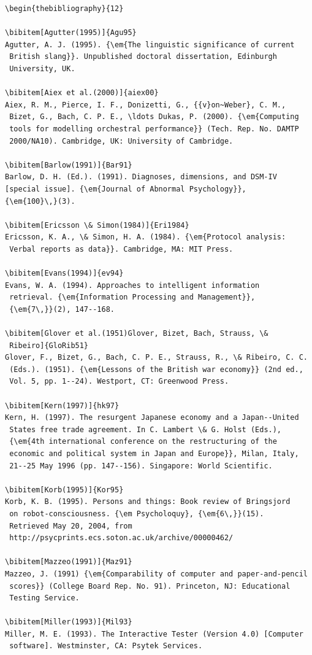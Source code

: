 \documentclass{nCSE2e}
\begin{document}
\begin{verbatim}
\begin{thebibliography}{12}

\bibitem[Agutter(1995)]{Agu95}
Agutter, A. J. (1995). {\em{The linguistic significance of current
 British slang}}. Unpublished doctoral dissertation, Edinburgh
 University, UK.

\bibitem[Aiex et al.(2000)]{aiex00}
Aiex, R. M., Pierce, I. F., Donizetti, G., {{v}on~Weber}, C. M.,
 Bizet, G., Bach, C. P. E., \ldots Dukas, P. (2000). {\em{Computing
 tools for modelling orchestral performance}} (Tech. Rep. No. DAMTP
 2000/NA10). Cambridge, UK: University of Cambridge.

\bibitem[Barlow(1991)]{Bar91}
Barlow, D. H. (Ed.). (1991). Diagnoses, dimensions, and DSM-IV
[special issue]. {\em{Journal of Abnormal Psychology}},
{\em{100}\,}(3).

\bibitem[Ericsson \& Simon(1984)]{Eri1984}
Ericsson, K. A., \& Simon, H. A. (1984). {\em{Protocol analysis:
 Verbal reports as data}}. Cambridge, MA: MIT Press.

\bibitem[Evans(1994)]{ev94}
Evans, W. A. (1994). Approaches to intelligent information
 retrieval. {\em{Information Processing and Management}},
 {\em{7\,}}(2), 147--168.

\bibitem[Glover et al.(1951)Glover, Bizet, Bach, Strauss, \&
 Ribeiro]{GloRib51}
Glover, F., Bizet, G., Bach, C. P. E., Strauss, R., \& Ribeiro, C. C.
 (Eds.). (1951). {\em{Lessons of the British war economy}} (2nd ed.,
 Vol. 5, pp. 1--24). Westport, CT: Greenwood Press.

\bibitem[Kern(1997)]{hk97}
Kern, H. (1997). The resurgent Japanese economy and a Japan--United
 States free trade agreement. In C. Lambert \& G. Holst (Eds.),
 {\em{4th international conference on the restructuring of the
 economic and political system in Japan and Europe}}, Milan, Italy,
 21--25 May 1996 (pp. 147--156). Singapore: World Scientific.

\bibitem[Korb(1995)]{Kor95}
Korb, K. B. (1995). Persons and things: Book review of Bringsjord
 on robot-consciousness. {\em Psycholoquy}, {\em{6\,}}(15).
 Retrieved May 20, 2004, from
 http://psycprints.ecs.soton.ac.uk/archive/00000462/

\bibitem[Mazzeo(1991)]{Maz91}
Mazzeo, J. (1991) {\em{Comparability of computer and paper-and-pencil
 scores}} (College Board Rep. No. 91). Princeton, NJ: Educational
 Testing Service.

\bibitem[Miller(1993)]{Mil93}
Miller, M. E. (1993). The Interactive Tester (Version 4.0) [Computer
 software]. Westminster, CA: Psytek Services.


\end{verbatim}
\end{document}
